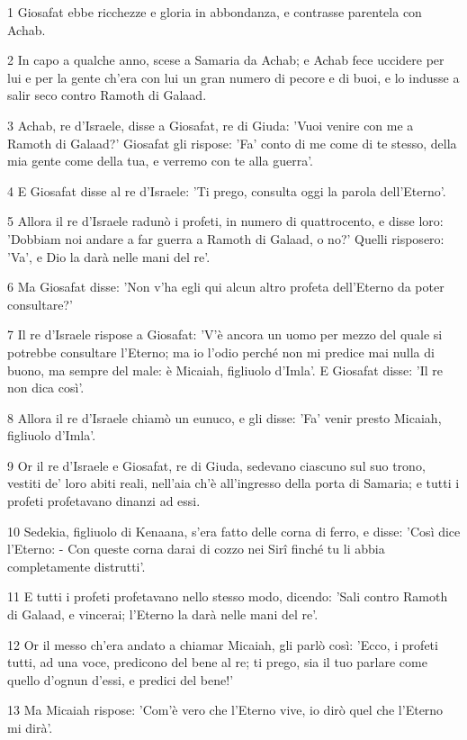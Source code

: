 \par 1 Giosafat ebbe ricchezze e gloria in abbondanza, e contrasse parentela con Achab.
\par 2 In capo a qualche anno, scese a Samaria da Achab; e Achab fece uccidere per lui e per la gente ch'era con lui un gran numero di pecore e di buoi, e lo indusse a salir seco contro Ramoth di Galaad.
\par 3 Achab, re d'Israele, disse a Giosafat, re di Giuda: 'Vuoi venire con me a Ramoth di Galaad?' Giosafat gli rispose: 'Fa' conto di me come di te stesso, della mia gente come della tua, e verremo con te alla guerra'.
\par 4 E Giosafat disse al re d'Israele: 'Ti prego, consulta oggi la parola dell'Eterno'.
\par 5 Allora il re d'Israele radunò i profeti, in numero di quattrocento, e disse loro: 'Dobbiam noi andare a far guerra a Ramoth di Galaad, o no?' Quelli risposero: 'Va', e Dio la darà nelle mani del re'.
\par 6 Ma Giosafat disse: 'Non v'ha egli qui alcun altro profeta dell'Eterno da poter consultare?'
\par 7 Il re d'Israele rispose a Giosafat: 'V'è ancora un uomo per mezzo del quale si potrebbe consultare l'Eterno; ma io l'odio perché non mi predice mai nulla di buono, ma sempre del male: è Micaiah, figliuolo d'Imla'. E Giosafat disse: 'Il re non dica così'.
\par 8 Allora il re d'Israele chiamò un eunuco, e gli disse: 'Fa' venir presto Micaiah, figliuolo d'Imla'.
\par 9 Or il re d'Israele e Giosafat, re di Giuda, sedevano ciascuno sul suo trono, vestiti de' loro abiti reali, nell'aia ch'è all'ingresso della porta di Samaria; e tutti i profeti profetavano dinanzi ad essi.
\par 10 Sedekia, figliuolo di Kenaana, s'era fatto delle corna di ferro, e disse: 'Così dice l'Eterno: - Con queste corna darai di cozzo nei Sirî finché tu li abbia completamente distrutti'.
\par 11 E tutti i profeti profetavano nello stesso modo, dicendo: 'Sali contro Ramoth di Galaad, e vincerai; l'Eterno la darà nelle mani del re'.
\par 12 Or il messo ch'era andato a chiamar Micaiah, gli parlò così: 'Ecco, i profeti tutti, ad una voce, predicono del bene al re; ti prego, sia il tuo parlare come quello d'ognun d'essi, e predici del bene!'
\par 13 Ma Micaiah rispose: 'Com'è vero che l'Eterno vive, io dirò quel che l'Eterno mi dirà'.
